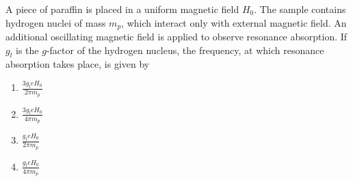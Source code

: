 \item A piece of paraffin is placed in a uniform magnetic field $H_0$. The sample contains hydrogen nuclei of mass $m_p$, which interact only with external magnetic field. An additional oscillating magnetic field is applied to observe resonance absorption. If $g_l$ is the $g$-factor of the hydrogen nucleus, the frequency, at which resonance absorption takes place, is given by
\begin{multicols}{4}
    \begin{enumerate}
        \item $\frac{3g_leH_0}{2\pi m_p}$
        \item $\frac{3g_leH_0}{4\pi m_p}$
        \item $\frac{g_leH_0}{2\pi m_p}$
        \item $\frac{g_leH_0}{4\pi m_p}$
    \end{enumerate}
\end{multicols}

